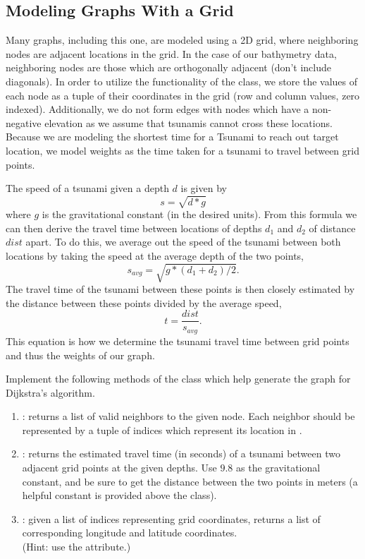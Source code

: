 \subsection*{Modeling Graphs With a Grid}

Many graphs, including this one, are modeled using a 2D grid, where neighboring nodes are adjacent locations in the grid.
In the case of our bathymetry data, neighboring nodes are those which are orthogonally adjacent (don't include diagonals).
In order to utilize the functionality of the  class, we store the values of each node as a tuple of their coordinates in the grid (row and column values, zero indexed).
Additionally, we do not form edges with nodes which have a non-negative elevation as we assume that tsunamis cannot cross these locations.
Because we are modeling the shortest time for a Tsunami to reach out target location, we model weights as the time taken for a tsunami to travel between grid points.

The speed of a tsunami given a depth $d$ is given by
\[s = \sqrt{d*g}\]
where $g$ is the gravitational constant (in the desired units).
From this formula we can then derive the travel time between locations of depths $d_1$ and $d_2$ of distance $dist$ apart.
To do this, we average out the speed of the tsunami between both locations by taking the speed at the average depth of the two points,
\[s_{avg} = \sqrt{g*(d_1+d_2)/2}.\]
The travel time of the tsunami between these points is then closely estimated by the distance between these points divided by the average speed,
\[t = \frac{dist}{s_{avg}}.\]
This equation is how we determine the tsunami travel time between grid points and thus the weights of our graph.

\begin{problem}
Implement the following methods of the  class which help generate the graph for Dijkstra's algorithm.
\begin{enumerate}
\item {}: returns a list of valid neighbors to the given node. Each neighbor should be represented by a tuple of indices which represent its location in .
\item {}: returns the estimated travel time (in seconds) of a tsunami between two adjacent grid points at the given depths.
Use $9.8$ as the gravitational constant, and be sure to get the distance between the two points in meters (a helpful constant is provided above the  class).
\item {}: given a list of indices representing grid coordinates, returns a list of corresponding longitude and latitude coordinates.
\\(Hint: use the  attribute.)
\end{enumerate}
\end{problem}

